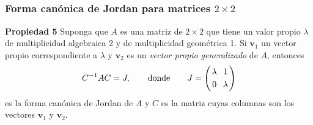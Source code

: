 \subsection{} 

\begin{frame}\frametitle{Forma canónica de Jordan para matrices $2\times 2$}
	
	\begin{prop}{\textbf{Propiedad 5}}\justifying
		Suponga que $A$ es una matriz de $2\times 2$ que tiene un valor propio $\lambda$ de multiplicidad 
		algebraica 2 y de multiplicidad geométrica 1. Si $\mathbf{v}_1$ un vector propio correspondiente a
		$\lambda$ y $\mathbf{v}_2$ es un \textit{vector propio generalizado} de $A$, entonces
		\[
		C^{-1} A C = J,
		\qquad \text{donde} \qquad
		J =
		\left(
		\begin{array}{@{\hspace{0.2\tabcolsep}}c@{\hspace{1.2\tabcolsep}}c@{\hspace{0.2\tabcolsep}}}
		\lambda & 1 \\[1mm]
		0 & \lambda
		\end{array}
		\right)
		\]
		es la forma canónica de Jordan de $A$ y $C$ es la matriz cuyas columnas son los vectores $\mathbf{v}_1$
		y  $\mathbf{v}_2$.
	\end{prop}
		
\end{frame}


\subsection{}

